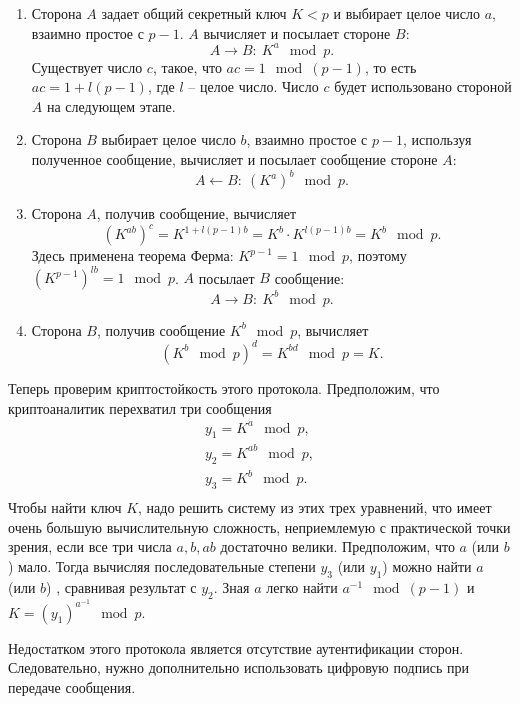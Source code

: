 \begin{enumerate}
    \item Сторона $A$ задает общий секретный ключ $K <p$ и выбирает целое число $a$, взаимно простое с $p-1$. $A$ вычисляет и посылает стороне $B$:
            \[ A \rightarrow B: ~ K^a \mod p. \]
        Существует число $c$, такое, что $a c =1 \mod (p-1)$, то есть $a c = 1 + l (p-1)$, где $l$ -- целое число. Число $c$ будет использовано стороной $A$ на следующем этапе.
    \item Сторона $B$ выбирает целое число $b$, взаимно простое с $p-1$, используя полученное сообщение, вычисляет и посылает сообщение стороне $A$:
            \[ A \leftarrow B: ~ (K^a)^b \mod p. \]
    \item Сторона $A$, получив сообщение, вычисляет
        \[ \left( K^{ab} \right)^c = K^{1 + l (p-1) b} = K^b \cdot K^{l (p-1) b} = K^b \mod p. \]
        Здесь применена теорема Ферма: $K^{p-1} = 1 \mod p$, поэтому $\left( K^{p-1} \right)^{lb} = 1 \mod p$.
        $A$ посылает $B$ сообщение:
            \[ A \rightarrow B: ~ K^b \mod p. \]
    \item Сторона $B$, получив сообщение $K^{b}\mod p$, вычисляет
        \[ (K^b \mod p)^d = K^{bd} \mod p = K. \]
\end{enumerate}

Теперь проверим криптостойкость этого протокола. Предположим, что криптоаналитик перехватил три сообщения
\[ \begin{array}{l}
    y_1 = K^a \mod p, \\
    y_2 = K^{ab} \mod p, \\
    y_3 = K^b \mod p. \\
\end{array} \]
Чтобы найти ключ $K$, надо решить систему из этих трех уравнений, что имеет очень большую вычислительную сложность, неприемлемую с практической точки зрения, если все три числа $a, b, ab$ достаточно велики. Предположим, что $a$ (или $b$) мало. Тогда вычисляя последовательные степени $y_3$ (или $y_1$) можно найти  $a$ (или $b$) , сравнивая результат с $y_2$. Зная $a$ легко найти $a^{-1}\mod(p-1)$ и $K=(y_1)^{a^{-1}}\mod p$.

Недостатком этого протокола является отсутствие аутентификации сторон. Следовательно, нужно дополнительно использовать цифровую подпись при передаче сообщения.
